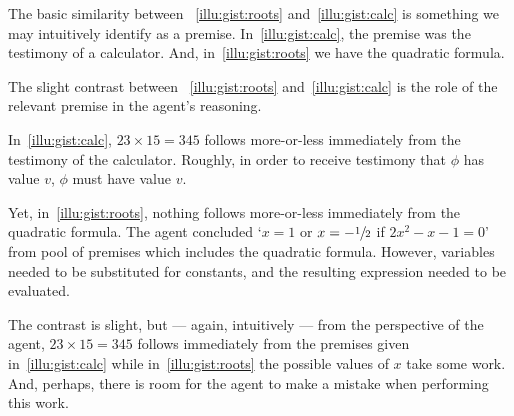 \begin{note}
  The basic similarity between ~\ref{illu:gist:roots} and~\ref{illu:gist:calc} is something we may intuitively identify as a premise.
  In~\autoref{illu:gist:calc}, the premise was the testimony of a calculator.
  And, in~\autoref{illu:gist:roots} we have the quadratic formula.

  The slight contrast between ~\ref{illu:gist:roots} and~\ref{illu:gist:calc} is the role of the relevant premise in the agent's reasoning.

  In~\autoref{illu:gist:calc}, \(23 \times 15 = 345\) follows more-or-less immediately from the testimony of the calculator.
  Roughly, in order to receive testimony that \(\phi\) has value \(v\), \(\phi\) must have value \(v\).

  Yet, in~\autoref{illu:gist:roots}, nothing follows more-or-less immediately from the quadratic formula.
  The agent concluded `\(x = 1\) or \(x = -\sfrac{1}{2}\) if \(2x^{2} - x - 1 = 0\)' from pool of premises which includes the quadratic formula.
  However, variables needed to be substituted for constants, and the resulting expression needed to be evaluated.

  The contrast is slight, but --- again, intuitively --- from the perspective of the agent, \(23 \times 15 = 345\) follows immediately from the premises given in~\autoref{illu:gist:calc} while in~\autoref{illu:gist:roots} the possible values of \(x\) take some work.
  And, perhaps, there is room for the agent to make a mistake when performing this work.
\end{note}

